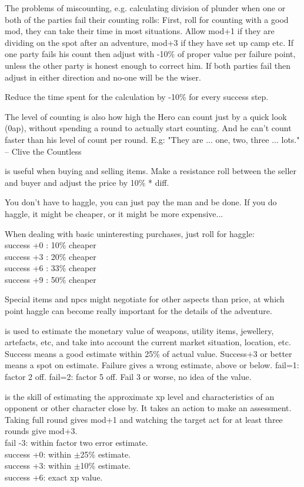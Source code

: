 The problems of miscounting, e.g. calculating division of plunder when one or both of the parties fail their counting rolls: First, roll for counting with a good mod, they can take their time in most situations. Allow mod+1 if they are dividing on the spot after an adventure, mod+3 if they have set up camp etc.
If one party fails his count then adjust with -10\% of proper value per failure point, unless the other party is honest enough to correct him. If both parties fail then adjust in either direction and no-one will be the wiser.

Reduce the time spent for the calculation by -10\% for every success step.

The level of counting is also how high the Hero can count just by a quick look (0ap), without spending a round to actually start counting. And he can't count faster than his level of count per round. E.g: "They are ... one, two, three ... lots." -- Clive the Countless


 is useful when buying and selling items. Make a resistance roll between the seller and buyer and adjust the price by 10\% * diff.

You don't have to haggle, you can just pay the man and be done. If you do haggle, it might be cheaper, or it might be more expensive...

When dealing with basic uninteresting purchases, just roll for haggle: \\
success +0 : 10\% cheaper \\
success +3 : 20\% cheaper \\
success +6 : 33\% cheaper \\
success +9 : 50\% cheaper

Special items and npcs might negotiate for other aspects than price, at which point haggle can become really important for the details of the adventure.


 is used to estimate the monetary value of weapons, utility items, jewellery, artefacts, etc, and take into account the current market situation, location, etc.
Success means a good estimate within 25\% of actual value. Success+3 or better means a spot on estimate. Failure gives a wrong estimate, above or below. fail=1: factor 2 off. fail=2: factor 5 off. Fail 3 or worse, no idea of the value.


 is the skill of estimating the approximate xp level and characteristics of an opponent or other character close by. It takes an action to make an assessment. Taking full round gives mod+1 and watching the target act for at least three rounds give mod+3. \\
fail -3: within factor two error estimate. \\
success +0: within $\pm$25\% estimate. \\
success +3: within $\pm$10\% estimate. \\
success +6: exact xp value.


